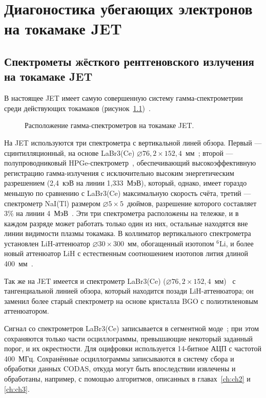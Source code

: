 \chapter{Диагоностика убегающих электронов на токамаке JET}
\label{ch:ch5}


\section{Спектрометы жёсткого рентгеновского излучения на токамаке JET}

В настоящее JET имеет самую совершенную систему гамма-спектрометрии среди действующих токамаков (рисунок~\ref{fig:jetHxrDetectorsScheme})~\cite{Iliasova2022}. 

\begin{figure}[ht!]
  \caption{ Расположение гамма-спектрометров на токамаке JET.~\cite{Iliasova2022} }
  \label{fig:jetHxrDetectorsScheme}
\end{figure}

На JET используются три спектрометра с вертикальной линей обзора. Первый --- сцинтилляционный, на основе LaBr3(Ce) $\varnothing 76,2 \times 152,4$~мм~\cite{Nocente2010}; второй --- полупроводниковый HPGe-спектрометр~\cite{Tardocchi2011}, обеспечивающий высокоэффективную регистрацию гамма-излучения с исключительно высоким энергетическим разрешением (2,4~кэВ на линии 1,333~МэВ), который, однако, имеет гораздо меньшую по сравнению с LaBr3(Ce) максимальную скорость счёта, третий --- спектрометр NaI(Tl) размером $\varnothing 5 \times 5$~дюймов, разрешение которого составляет 3\% на линии 4~МэВ~\cite{Tardocchi2008}. Эти три спектрометра расположены на тележке, и в каждом разряде может работать только один из них, остальные находятся вне линии видимости плазмы токамака. В коллиматор вертикального спектрометра установлен LiH-аттенюатор $\varnothing 30 \times 300$~мм, обогащенный изотопом ${}^6$Li, и более новый аттенюатор LiH с естественным соотношением изотопов лития длиной 400~мм~\cite{Murari2008}.

Так же на JET имеется и спектрометр  LaBr3(Ce) ($\varnothing 76,2 \times 152,4$~мм)~\cite{Nocente2021} с тангенциальной линией обзора, который находится позади LiH-аттенюатора; он заменил более старый спектрометр на основе кристалла BGO с полиэтиленовым аттенюатором.~\cite{Curuia2017}

Сигнал со спектрометров LaBr3(Ce) записывается в сегментной моде~\cite{Pereira2008,Pereira2011}; при этом сохраняются только части осциллограммы, превышающие некоторый заданный порог, и их окрестности. Для оцифровки используется 14-битное АЦП с частотой 400~МГц. Сохранённые осциллограммы записываются в систему сбора и обработки данных CODAS, откуда могут быть впоследствии извлечены и обработаны, например, с помощью алгоритмов, описанных в главах~\ref{ch:ch2} и \ref{ch:ch3}. 

